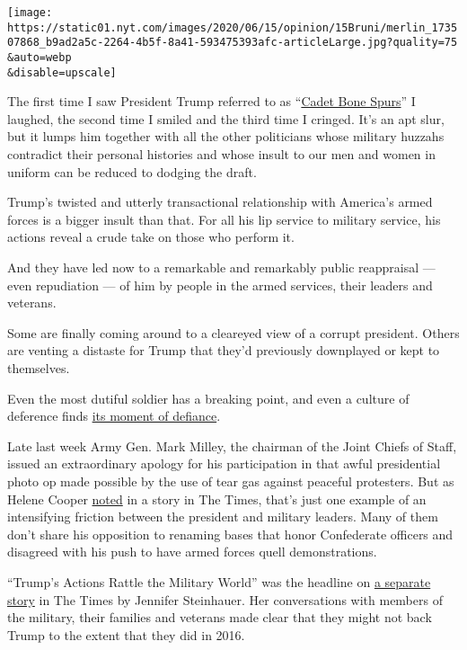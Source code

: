 \texttt{[image: https://static01.nyt.com/images/2020/06/15/opinion/15Bruni/merlin\_173507868\_b9ad2a5c-2264-4b5f-8a41-593475393afc-articleLarge.jpg?quality=75\\\&auto=webp\\\&disable=upscale]}

The first time I saw President Trump referred to as
``\href{https://www.cnn.com/2018/02/06/politics/tammy-duckworth-cadet-bone-spurs/index.html}{Cadet
Bone Spurs}'' I laughed, the second time I smiled and the third time I
cringed. It's an apt slur, but it lumps him together with all the other
politicians whose military huzzahs contradict their personal histories
and whose insult to our men and women in uniform can be reduced to
dodging the draft.

Trump's twisted and utterly transactional relationship with America's
armed forces is a bigger insult than that. For all his lip service to
military service, his actions reveal a crude take on those who perform
it.

And they have led now to a remarkable and remarkably public reappraisal
--- even repudiation --- of him by people in the armed services, their
leaders and veterans.

Some are finally coming around to a cleareyed view of a corrupt
president. Others are venting a distaste for Trump that they'd
previously downplayed or kept to themselves.

Even the most dutiful soldier has a breaking point, and even a culture
of deference finds
\href{https://time.com/5849362/military-leaders-denounce-trump/}{its
moment of defiance}.

Late last week Army Gen. Mark Milley, the chairman of the Joint Chiefs
of Staff, issued an extraordinary apology for his participation in that
awful presidential photo op made possible by the use of tear gas against
peaceful protesters. But as Helene Cooper
\href{https://www.nytimes.com/2020/06/11/us/politics/trump-milley-military-protests-lafayette-square.html?action=click\&module=RelatedLinks\&pgtype=Article}{noted}
in a story in The Times, that's just one example of an intensifying
friction between the president and military leaders. Many of them don't
share his opposition to renaming bases that honor Confederate officers
and disagreed with his push to have armed forces quell demonstrations.

``Trump's Actions Rattle the Military World'' was the headline on
\href{https://www.nytimes.com/2020/06/12/us/politics/trump-polls-military-approval.html?smid=tw-share}{a
separate story} in The Times by Jennifer Steinhauer. Her conversations
with members of the military, their families and veterans made clear
that they might not back Trump to the extent that they did in 2016.

